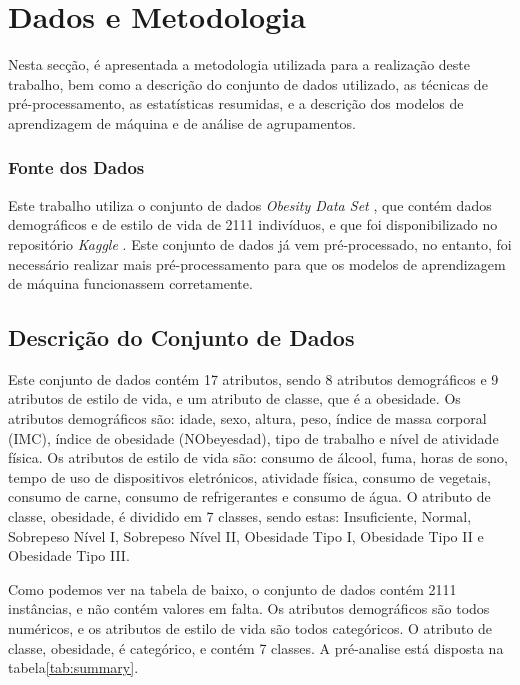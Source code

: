 \documentclass{easychair}
\begin{document}
\section{Dados e Metodologia}

Nesta secção, é apresentada a metodologia utilizada para a realização deste trabalho, bem como a descrição do conjunto de dados utilizado, as técnicas de pré-processamento, as estatísticas resumidas, e a descrição dos modelos de aprendizagem de máquina e de análise de agrupamentos.

\subsubsection{Fonte dos Dados}

Este trabalho utiliza o conjunto de dados \textit{Obesity Data Set} \cite{obesity}, que contém dados demográficos e de estilo de vida de 2111 indivíduos, e que foi disponibilizado no repositório \textit{Kaggle} \cite{kaggle}. Este conjunto de dados já vem pré-processado, no entanto, foi necessário realizar mais pré-processamento para que os modelos de aprendizagem de máquina funcionassem corretamente.

\subsection{Descrição do Conjunto de Dados}

Este conjunto de dados contém 17 atributos, sendo 8 atributos demográficos e 9 atributos de estilo de vida, e um atributo de classe, que é a obesidade. Os atributos demográficos são: idade, sexo, altura, peso, índice de massa corporal (IMC), índice de obesidade (NObeyesdad), tipo de trabalho e nível de atividade física. Os atributos de estilo de vida são: consumo de álcool, fuma, horas de sono, tempo de uso de dispositivos eletrónicos, atividade física, consumo de vegetais, consumo de carne, consumo de refrigerantes e consumo de água. O atributo de classe, obesidade, é dividido em 7 classes, sendo estas: Insuficiente, Normal, Sobrepeso Nível I, Sobrepeso Nível II, Obesidade Tipo I, Obesidade Tipo II e Obesidade Tipo III.

Como podemos ver na tabela de baixo, o conjunto de dados contém 2111 instâncias, e não contém valores em falta. Os atributos demográficos são todos numéricos, e os atributos de estilo de vida são todos categóricos. O atributo de classe, obesidade, é categórico, e contém 7 classes. A pré-analise está disposta na tabela\ref{tab:summary}.
\end{document}
